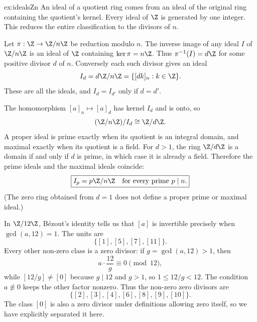 \begin{solution}{ex:idealsZn}
\idea An ideal of a quotient ring comes from an ideal of the original ring containing the quotient's kernel. Every ideal of $\Z$ is generated by one integer. This reduces the entire classification to the divisors of $n$.

\writeup Let $\pi:\Z\to\Z/n\Z$ be reduction modulo $n$. The inverse image of any ideal $I$ of $\Z/n\Z$ is an ideal of $\Z$ containing $\ker\pi=n\Z$. Thus $\pi^{-1}(I)=d\Z$ for some positive divisor $d$ of $n$. Conversely each such divisor gives an ideal
\[
I_d=d\Z/n\Z=\{[dk]_n:k\in\Z\}.
\]
These are all the ideals, and $I_d=I_{d'}$ only if $d=d'$.

The homomorphism $[a]_n\mapsto[a]_d$ has kernel $I_d$ and is onto, so
\[
(\Z/n\Z)/I_d\cong\Z/d\Z.
\]
A proper ideal is prime exactly when its quotient is an integral domain, and maximal exactly when its quotient is a field. For $d>1$, the ring $\Z/d\Z$ is a domain if and only if $d$ is prime, in which case it is already a field. Therefore the prime ideals and the maximal ideals coincide:
\[
\boxed{I_p=p\Z/n\Z\quad\text{for every prime }p\mid n.}
\]
(The zero ring obtained from $d=1$ does not define a proper prime or maximal ideal.)

In $\Z/12\Z$, Bézout's identity tells us that $[a]$ is invertible precisely when $\gcd(a,12)=1$. The units are
\[
\boxed{\{[1],[5],[7],[11]\}}.
\]
Every other non-zero class is a zero divisor: if $g=\gcd(a,12)>1$, then
\[
a\cdot\frac{12}{g}\equiv0\pmod{12},
\]
while $[12/g]\ne[0]$ because $g\mid12$ and $g>1$, so $1\le12/g<12$. The condition $a\not\equiv0$ keeps the other factor nonzero. Thus the non-zero zero divisors are
\[
\boxed{\{[2],[3],[4],[6],[8],[9],[10]\}}.
\]
The class $[0]$ is also a zero divisor under definitions allowing zero itself, so we have explicitly separated it here.
\end{solution}

